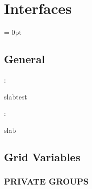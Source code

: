 
\section{Interfaces} 


\parskip = 0pt

\vspace{3mm} \subsection*{General}

: 

slabtest
\vspace{2mm}

: 

slab
\vspace{2mm}
\subsection*{Grid Variables}
\vspace{5mm}\subsubsection{PRIVATE GROUPS}

\vspace{5mm}

